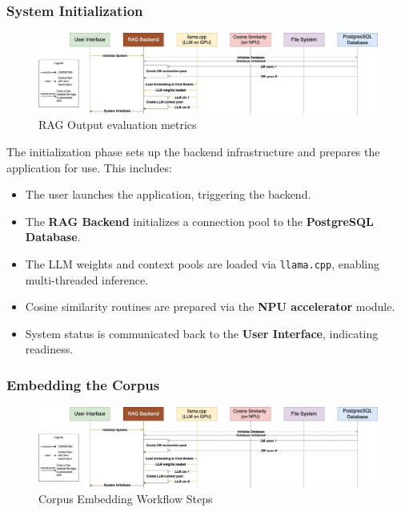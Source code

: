 \subsubsection{System Initialization}
\label{subsec:AppDesignWorkflow-SystemInitialization}

\begin{figure}[H]
    \centering
    \includegraphics[width=1.0\linewidth]{images/tldr-app-worklfow-pt1.jpg}
    \caption{RAG Output evaluation metrics ~\cite{cardenas2023rag}}
    \label{fig:autoregressive_decoding}
\end{figure}


The initialization phase sets up the backend infrastructure and prepares the application for use. This includes:

\begin{itemize}
    \item The user launches the application, triggering the backend.
    \item The \textbf{RAG Backend} initializes a connection pool to the \textbf{PostgreSQL Database}.
    \item The LLM weights and context pools are loaded via \texttt{llama.cpp}, enabling multi-threaded inference.
    \item Cosine similarity routines are prepared via the \textbf{NPU accelerator} module.
    \item System status is communicated back to the \textbf{User Interface}, indicating readiness.
\end{itemize}


\subsubsection{Embedding the Corpus}
\label{subsec:AppDesignWorkflow-EmbeddingCorpus}

\begin{figure}[H]
    \centering
    \includegraphics[width=1.0\linewidth]{images/tldr-app-worklfow-pt1.jpg}
    \caption{Corpus Embedding Workflow Steps}
    \label{fig:corpusembedworkflowsteps}
\end{figure}


